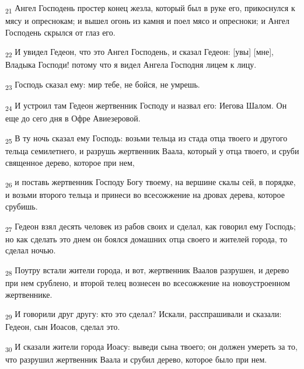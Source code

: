 \begin{tcolorbox}
\textsubscript{21} Ангел Господень простер конец жезла, который был в руке его, прикоснулся к мясу и опреснокам; и вышел огонь из камня и поел мясо и опресноки; и Ангел Господень скрылся от глаз его.
\end{tcolorbox}
\begin{tcolorbox}
\textsubscript{22} И увидел Гедеон, что это Ангел Господень, и сказал Гедеон: [увы] [мне], Владыка Господи! потому что я видел Ангела Господня лицем к лицу.
\end{tcolorbox}
\begin{tcolorbox}
\textsubscript{23} Господь сказал ему: мир тебе, не бойся, не умрешь.
\end{tcolorbox}
\begin{tcolorbox}
\textsubscript{24} И устроил там Гедеон жертвенник Господу и назвал его: Иегова Шалом. Он еще до сего дня в Офре Авиезеровой.
\end{tcolorbox}
\begin{tcolorbox}
\textsubscript{25} В ту ночь сказал ему Господь: возьми тельца из стада отца твоего и другого тельца семилетнего, и разрушь жертвенник Ваала, который у отца твоего, и сруби священное дерево, которое при нем,
\end{tcolorbox}
\begin{tcolorbox}
\textsubscript{26} и поставь жертвенник Господу Богу твоему, на вершине скалы сей, в порядке, и возьми второго тельца и принеси во всесожжение на дровах дерева, которое срубишь.
\end{tcolorbox}
\begin{tcolorbox}
\textsubscript{27} Гедеон взял десять человек из рабов своих и сделал, как говорил ему Господь; но как сделать это днем он боялся домашних отца своего и жителей города, то сделал ночью.
\end{tcolorbox}
\begin{tcolorbox}
\textsubscript{28} Поутру встали жители города, и вот, жертвенник Ваалов разрушен, и дерево при нем срублено, и второй телец вознесен во всесожжение на новоустроенном жертвеннике.
\end{tcolorbox}
\begin{tcolorbox}
\textsubscript{29} И говорили друг другу: кто это сделал? Искали, расспрашивали и сказали: Гедеон, сын Иоасов, сделал это.
\end{tcolorbox}
\begin{tcolorbox}
\textsubscript{30} И сказали жители города Иоасу: выведи сына твоего; он должен умереть за то, что разрушил жертвенник Ваала и срубил дерево, которое было при нем.
\end{tcolorbox}
